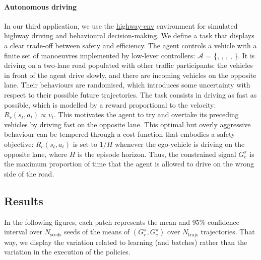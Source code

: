\paragraph{Autonomous driving}
In our third application, we use the \href{https://github.com/eleurent/highway-env}{highway-env} environment \citep{highway-env} for simulated highway driving and behavioural decision-making.
We define a task that displays a clear trade-off between safety and efficiency. The agent controls a vehicle with a finite set of manoeuvres implemented by low-lever controllers: $\mathcal{A}$ = \{, , , , \}. It is driving on a two-lane road populated with other traffic participants: the vehicles in front of the agent drive slowly, and there are incoming vehicles on the opposite lane. Their behaviours are randomised, which introduces some uncertainty with respect to their possible future trajectories.
The task consists in driving as fast as possible, which is modelled by a reward proportional to the velocity: $R_r(s_t, a_t) \propto v_t$. This motivates the agent to try and overtake its preceding vehicles by driving fast on the opposite lane. This optimal but overly aggressive behaviour can be tempered through a cost function that embodies a safety objective: $R_c(s_t, a_t)$ is set to $1/H$ whenever the ego-vehicle is driving on the opposite lane, where $H$ is the episode horizon. Thus, the constrained signal $G_c^\pi$ is the maximum proportion of time that the agent is allowed to drive on the wrong side of the road.

\subsection{Results}
\label{subsec:results}
In the following figures, each patch represents the mean and 95\% confidence interval over $N_{\text{seeds}}$ seeds of the means of $(G_r^\pi,G_c^\pi)$ over $N_\text{trajs}$ trajectories. That way, we display the variation related to learning (and batches) rather than the variation in the execution of the policies.

